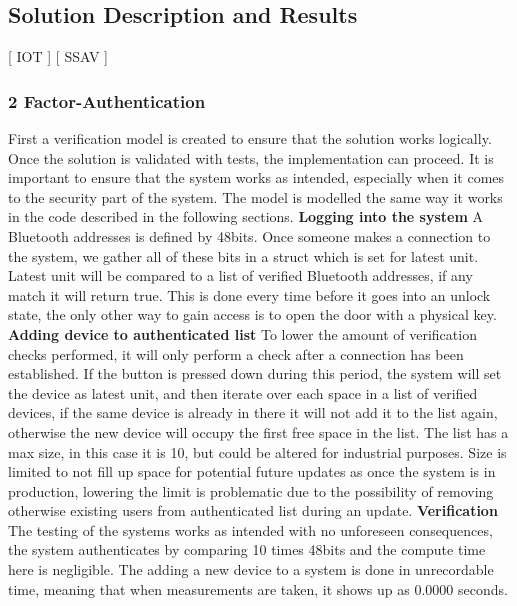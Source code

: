 \subsection{Solution Description and Results}
[ IOT ] [ SSAV ]
\newline
\subsubsection{2 Factor-Authentication}
First a verification model is created to ensure that the solution works logically. Once the solution is validated with tests, the implementation can proceed. It is important to ensure that the system works as intended, especially when it comes to the security part of the system. The model is modelled the same way it works in the code described in the following sections.
\newline
\textbf{Logging into the system}\newline
A Bluetooth addresses is defined by 48bits\cite{BluetoothBeacon}. Once someone makes a connection to the system, we gather all of these bits in a struct which is set for latest unit. Latest unit will be compared to a list of verified Bluetooth addresses, if any match it will return true. This is done every time before it goes into an unlock state, the only other way to gain access is to open the door with a physical key.
\newline
\textbf{Adding device to authenticated list}\newline
To lower the amount of verification checks performed, it will only perform a check after a connection has been established. If the button is pressed down during this period, the system will set the device as latest unit, and then iterate over each space in a list of verified devices, if the same device is already in there it will not add it to the list again, otherwise the new device will occupy the first free space in the list. The list has a max size, in this case it is 10, but could be altered for industrial purposes. Size is limited to not fill up space for potential future updates as once the system is in production, lowering the limit is problematic due to the possibility of removing otherwise existing users from authenticated list during an update.
\newline
\textbf{Verification}\newline
The testing of the systems works as intended with no unforeseen consequences, the system authenticates by comparing 10 times 48bits and the compute time here is negligible. The adding a new device to a system is done in unrecordable time, meaning that when measurements are taken, it shows up as 0.0000 seconds.

